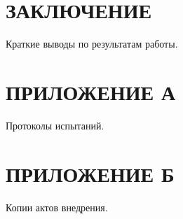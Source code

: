 \section*{ЗАКЛЮЧЕНИЕ}

Краткие выводы по результатам работы.

\newpage
\section*{ПРИЛОЖЕНИЕ А}

Протоколы испытаний.

\clearpage
\section*{ПРИЛОЖЕНИЕ Б}

Копии актов внедрения.
